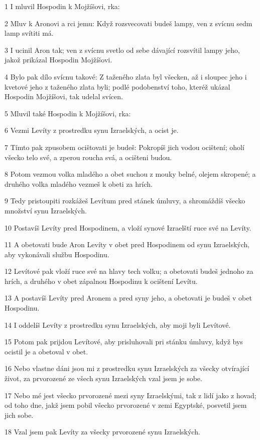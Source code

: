 \par 1 I mluvil Hospodin k Mojžíšovi, rka:
\par 2 Mluv k Aronovi a rci jemu: Když rozsvecovati budeš lampy, ven z svícnu sedm lamp svítiti má.
\par 3 I ucinil Aron tak; ven z svícnu svetlo od sebe dávající rozsvítil lampy jeho, jakož prikázal Hospodin Mojžíšovi.
\par 4 Bylo pak dílo svícnu takové: Z taženého zlata byl všecken, až i sloupec jeho i kvetové jeho z taženého zlata byli; podlé podobenství toho, kteréž ukázal Hospodin Mojžíšovi, tak udelal svícen.
\par 5 Mluvil také Hospodin k Mojžíšovi, rka:
\par 6 Vezmi Levíty z prostredku synu Izraelských, a ocist je.
\par 7 Tímto pak zpusobem ocištovati je budeš: Pokropíš jich vodou ocištení; oholí všecko telo své, a zperou roucha svá, a ocišteni budou.
\par 8 Potom vezmou volka mladého a obet suchou z mouky belné, olejem skropené; a druhého volka mladého vezmeš k obeti za hrích.
\par 9 Tedy pristoupiti rozkážeš Levítum pred stánek úmluvy, a shromáždíš všecko množství synu Izraelských.
\par 10 Postavíš Levíty pred Hospodinem, a vloží synové Izraelští ruce své na Levíty.
\par 11 A obetovati bude Aron Levíty v obet pred Hospodinem od synu Izraelských, aby vykonávali službu Hospodinu.
\par 12 Levítové pak vloží ruce své na hlavy tech volku; a obetovati budeš jednoho za hrích, a druhého v obet zápalnou Hospodinu k ocištení Levítu.
\par 13 A postavíš Levíty pred Aronem a pred syny jeho, a obetovati je budeš v obet Hospodinu.
\par 14 I oddelíš Levíty z prostredku synu Izraelských, aby moji byli Levítové.
\par 15 Potom pak prijdou Levítové, aby prisluhovali pri stánku úmluvy, když bys ocistil je a obetoval v obet.
\par 16 Nebo vlastne dáni jsou mi z prostredku synu Izraelských za všecky otvírající život, za prvorozené ze všech synu Izraelských vzal jsem je sobe.
\par 17 Nebo mé jest všecko prvorozené mezi syny Izraelskými, tak z lidí jako z hovad; od toho dne, jakž jsem pobil všecko prvorozené v zemi Egyptské, posvetil jsem jich sobe.
\par 18 Vzal jsem pak Levíty za všecky prvorozené synu Izraelských.
